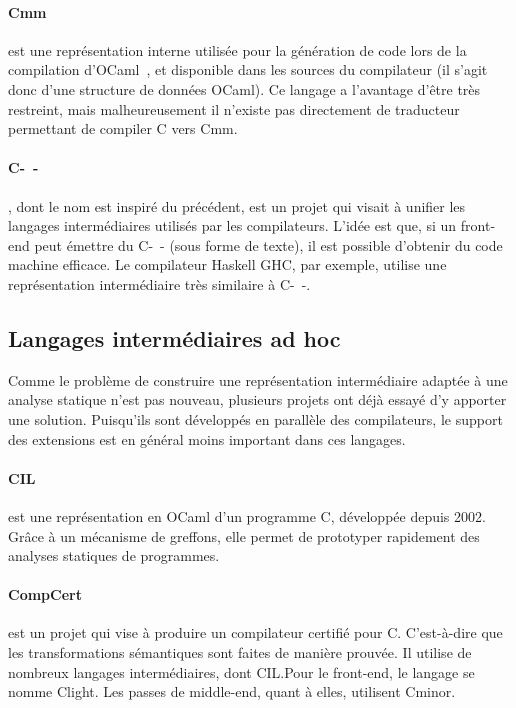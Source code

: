 \paragraph{Cmm} est une représentation interne utilisée pour la génération de
code lors de la compilation d'OCaml~, et disponible dans les sources
du compilateur (il s'agit donc d'une structure de données OCaml). Ce langage a
l'avantage d'être très restreint, mais malheureusement il n'existe pas
directement de traducteur permettant de compiler C vers Cmm.

\paragraph{C-~-}\cite{spjcmm} , dont le nom est inspiré du précédent,
est un projet qui visait à unifier les langages intermédiaires utilisés par les
compilateurs. L'idée est que, si un front-end peut émettre du C-~- (sous forme de
texte), il est possible d'obtenir du code machine efficace. Le compilateur
Haskell GHC, par exemple, utilise une représentation intermédiaire très
similaire à C-~-.

\subsection*{Langages intermédiaires ad hoc}

Comme le problème de construire une représentation intermédiaire adaptée à une
analyse statique n'est pas nouveau, plusieurs projets ont déjà essayé d'y
apporter une solution. Puisqu'ils sont développés en parallèle des compilateurs,
le support des extensions est en général moins important dans ces langages.

\paragraph{CIL}\cite{NeculaCil}  est une représentation en
OCaml d'un programme C, développée depuis 2002. Grâce à un mécanisme de
greffons, elle permet de prototyper rapidement des analyses statiques de
programmes.

\paragraph{CompCert} est un projet qui vise à produire un compilateur certifié
pour C. C'est-à-dire que les transformations sémantiques sont faites de manière
prouvée. Il utilise de nombreux langages intermédiaires, dont CIL.\@ Pour le
front-end, le langage se nomme Clight\cite{cfront}. Les passes de middle-end,
quant à elles, utilisent Cminor\cite{cminorSL}.

